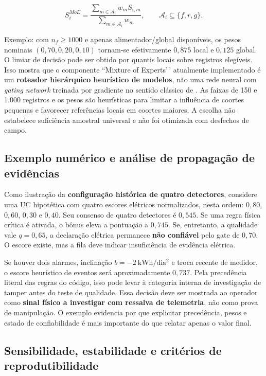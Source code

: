 \[S^{MoE}_i=\frac{\sum_{m\in\mathcal A_i}w_mS_{i,m}}{\sum_{m\in\mathcal A_i}w_m},\qquad \mathcal A_i\subseteq\{f,r,g\}.\]

Exemplo: com \(n_f\ge1000\) e apenas alimentador/global disponíveis, os pesos nominais \((0{,}70,0{,}20,0{,}10)\) tornam-se efetivamente \(0{,}875\) local e \(0{,}125\) global. O limiar de decisão pode ser obtido por quantis locais sobre registros elegíveis. Isso mostra que o componente ``Mixture of Experts'\,' atualmente implementado é um \textbf{roteador hierárquico heurístico de modelos}, não uma rede neural com \emph{gating network} treinada por gradiente no sentido clássico de \textcite{jacobs1991}. As faixas de 150 e 1.000 registros e os pesos são heurísticas para limitar a influência de coortes pequenas e favorecer referências locais em coortes maiores. A escolha não estabelece suficiência amostral universal e não foi otimizada com desfechos de campo.

\subsection{Exemplo numérico e análise de propagação de evidências}\label{exemplo-numuxe9rico-e-anuxe1lise-de-propagauxe7uxe3o-de-eviduxeancias}

Como ilustração da \textbf{configuração histórica de quatro detectores}, considere uma UC hipotética com quatro escores elétricos normalizados, nesta ordem: \(0{,}80\), \(0{,}60\), \(0{,}30\) e \(0{,}40\). Seu consenso de quatro detectores é \(0{,}545\). Se uma regra física crítica é ativada, o bônus eleva a pontuação a \(0{,}745\). Se, entretanto, a qualidade vale \(q=0{,}65\), a declaração elétrica permanece \textbf{não confiável} pelo gate de \(0{,}70\). O escore existe, mas a fila deve indicar insuficiência de evidência elétrica.

Se houver dois alarmes, inclinação \(b=-2\ \mathrm{kWh/dia^2}\) e troca recente de medidor, o escore heurístico de eventos será aproximadamente \(0{,}737\). Pela precedência literal das regras do código, isso pode levar à categoria interna de investigação de tamper antes do teste de qualidade. Essa decisão deve ser mostrada ao operador como \textbf{sinal físico a investigar com ressalva de telemetria}, não como prova de manipulação. O exemplo evidencia por que explicitar precedência, pesos e estado de confiabilidade é mais importante do que relatar apenas o valor final.

\subsection{Sensibilidade, estabilidade e critérios de reprodutibilidade}\label{sensibilidade-estabilidade-e-crituxe9rios-de-reprodutibilidade}

